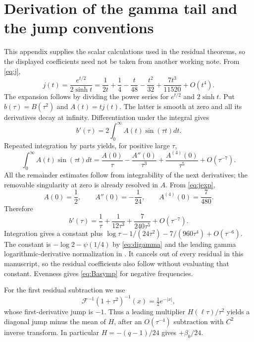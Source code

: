 \documentclass[11pt]{article}
\numberwithin{equation}{section}
\theoremstyle{definition}
\theoremstyle{remark}
\begin{document}
\section{Derivation of the gamma tail and the jump conventions}
\label{app:asymptotic}
This appendix supplies the scalar calculations used in the residual theorems, so the displayed coefficients need not be taken from another working note. From \eqref{eq:j},
\begin{equation}
 j(t)=\frac{e^{t/2}}{2\sinh t}
 =\frac1{2t}+\frac14-\frac{t}{48}-\frac{t^2}{32}
 +\frac{7t^3}{11520}+O(t^4).
 \label{eq:jexp}
\end{equation}
The expansion follows by dividing the power series for $e^{t/2}$ and $2\sinh t$. Put $b(\tau)=B(\tau^2)$ and $A(t)=tj(t)$. The latter is smooth at zero and all its derivatives decay at infinity. Differentiation under the integral gives
\begin{equation}
 b'(\tau)=2\int_0^\infty A(t)\sin(\tau t)dt.
\end{equation}
Repeated integration by parts yields, for positive large $\tau$,
\begin{equation}
 \int_0^\infty A(t)\sin(\tau t)dt
 =\frac{A(0)}\tau-\frac{A''(0)}{\tau^3}
 +\frac{A^{(4)}(0)}{\tau^5}+O(\tau^{-7}).
\end{equation}
All the remainder estimates follow from integrability of the next derivatives; the removable singularity at zero is already resolved in $A$. From \eqref{eq:jexp},
\begin{equation}
 A(0)=\frac12,\qquad A''(0)=-\frac1{24},\qquad
 A^{(4)}(0)=\frac7{480}.
\end{equation}
Therefore
\begin{equation}
 b'(\tau)=\frac1\tau+\frac1{12\tau^3}+
 \frac7{240\tau^5}+O(\tau^{-7}).
\end{equation}
Integration gives a constant plus $\log\tau-1/(24\tau^2)-7/(960\tau^4)+O(\tau^{-6})$. The constant is $-\log2-\psi(1/4)$ by \eqref{eq:digamma} and the leading gamma logarithmic-derivative normalization in \cite{background}. It cancels out of every residual in this manuscript, so the residual coefficients also follow without evaluating that constant. Evenness gives \eqref{eq:Basymp} for negative frequencies.

For the first residual subtraction we use
\begin{equation}
 \mathcal F^{-1}(1+\tau^2)^{-1}(x)=\tfrac12e^{-|x|},
\end{equation}
whose first-derivative jump is $-1$. Thus a leading multiplier $H(\ell\tau)/\tau^2$ yields a diagonal jump minus the mean of $H$, after an $O(\tau^{-4})$ subtraction with $C^2$ inverse transform. In particular $H=-(q-1)/24$ gives $+\beta_0/24$.
\end{document}
